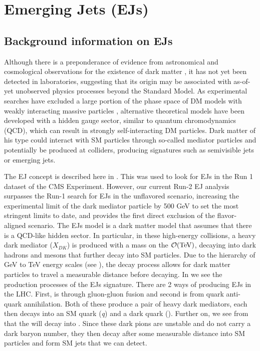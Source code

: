 \chapter{Emerging Jets (EJs) \label{ch:emj}}


\section{Background information on EJs}

Although there is a preponderance of evidence from astronomical and cosmological observations for the existence of dark matter \cite{What_is_DM}, it has not yet been detected in laboratories, suggesting that its origin may be associated with as-of-yet unobserved physics processes beyond the Standard Model. As experimental searches have excluded a large portion of the phase space of DM models with weakly interacting massive particles \cite{WIMPS}, alternative theoretical models have been developed with a hidden gauge sector, similar to quantum chromodynamics (QCD), which can result in strongly self-interacting DM particles. Dark matter of his type could interact with SM particles through so-called mediator particles and potentially be produced at colliders, producing signatures such as semivisible jets \cite{Nabili:2886140} or emerging jets\cite{sirunyan2019search}.

The EJ concept is described here in \cite{Schwaller:2015gea}. This was used to look for EJs in the Run 1 dataset of the CMS Experiment.
However, our current Run-2 EJ analysis surpasses the Run-1 search for EJs in the unflavored scenario, increasing the experimental limit of the dark mediator particle by 500 GeV to set the most stringent limits to date, and provides the first direct exclusion of the flavor-aligned scenario.
The EJs model is a dark matter model that assumes that there is a QCD-like hidden sector. In particular, in these high-energy collisions, a heavy dark mediator ($X_{DK}$) is produced with a mass on the $\order{\text{TeV}}$, decaying into dark hadrons and mesons that further decay into SM particles. Due to the hierarchy of GeV to TeV energy scales (see ), the decay process allows for dark matter particles to travel a measurable distance before decaying.
In  we see the production processes of the EJs signature. There are 2 ways of producing EJs in the LHC. First, is through gluon-gluon fusion and second is from quark anti-quark annihilation.
Both of these produce a pair of heavy dark mediators, each then decays into an SM quark (\textit{q}) and a dark quark (\Qdark). Further on, we see from  that the \Qdark will decay into \pidark.
Since these dark pions are unstable and do not carry a dark baryon number, they then decay after some measurable distance into SM particles \cite{Bai_2014} and form SM jets that we can detect.


